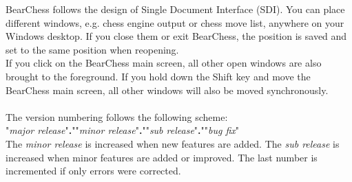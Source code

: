 \documentclass[11pt,a4paper]{article}
\begin{document}
	BearChess follows the design of Single Document Interface (SDI). You can place different windows, e.g. chess engine output or chess move list, anywhere on your Windows desktop. If you close them or exit BearChess, the position is saved and set to the same position when reopening.\\ 
	If you click on the BearChess main screen, all other open windows are also brought to the foreground. If you hold down the Shift key and move the BearChess main screen, all other windows will also be moved synchronously.\\\\
	The version numbering follows the following scheme:\\ 
	"\textit{major release}"\textbf{.}""\textit{minor release}"\textbf{.}""\textit{sub release}"\textbf{.}""\textit{bug fix}"\\
	The \textit{minor release} is increased when new features are added. The \textit{sub release} is increased when minor features are added or improved. The last number is incremented if only errors were corrected.
	
\end{document}
